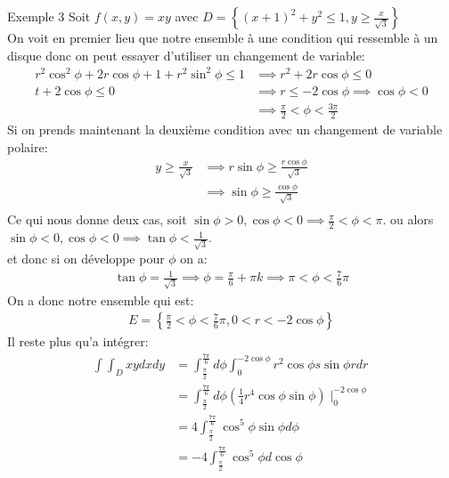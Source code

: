 \begin{parag}{Exemple 3}
    Soit $f\left(x, y\right) =  xy$ avec $D =  \left\{ \left(x + 1\right)^2 + y^2 \leq 1 , y \geq \frac{x}{\sqrt{3}}\right\}$\\
On voit en premier lieu que notre ensemble à une condition qui ressemble à un disque donc on peut essayer d'utiliser un changement de variable:
\begin{align*} 
    r^2\cos^2\phi + 2r\cos\phi + 1 + r^2\sin^2\phi \leq 1 &\implies r^2 + 2r\cos\phi \leq 0\\
    t + 2\cos\phi \leq 0 &\implies r \leq -2\cos\phi \implies \cos\phi < 0\\
                         &\implies \frac{\pi}{2} < \phi < \frac{3\pi}{2}
\end{align*}
Si on prends maintenant la deuxième condition avec un changement de variable polaire:
\begin{align*} 
    y \geq \frac{x}{\sqrt{3}} &\implies r \sin \phi \geq \frac{r \cos \phi}{\sqrt{3}}\\
                              &\implies \sin\phi \geq \frac{\cos \phi}{\sqrt{3}}\\
\end{align*}
Ce qui nous donne deux cas, soit $\sin\phi > 0, \cos \phi < 0 \implies \frac{\pi}{2} < \phi < \pi$. ou alors $\sin \phi < 0, \cos\phi < 0 \implies \tan \phi < \frac{1}{\sqrt{3}}$.\\
et donc si on développe pour $\phi$ on a:
\begin{align*} 
    \tan \phi =  \frac{1}{\sqrt{3}} \implies \phi =  \frac{\pi}{6} + \pi k \implies \pi < \phi < \frac{7}{6}\pi
\end{align*}
On a donc notre ensemble qui est:
\begin{align*} 
    E =  \left\{\frac{\pi}{2} < \phi < \frac{7}{6}\pi, 0 < r < -2 \cos\phi\right\}
\end{align*}
Il reste plus qu'a intégrer:
\begin{align*} 
    \int\int_D xy dxdy &=  \int_{\frac{\pi}{2}}^{\frac{7\pi}{6}}d\phi \int_0^{-2\cos\phi}r^2 \cos\phi s\sin\phi r dr\\
                       &= \int_{\frac{\pi}{2}}^{\frac{7\pi}{6}}d\phi \left(\frac{1}{4}r^4 \cos \phi \sin\phi\right)\mid_0^{-2\cos\phi}\\
                       &= 4 \int_{\frac{\pi}{2}}^{\frac{7\pi}{6}}\cos^5\phi\sin\phi d\phi\\
                       &= -4 \int_{\frac{\pi}{2}}^{\frac{7\pi}{6}}\cos^5\phi d \cos \phi\\ 

\end{align*}
\end{parag}

